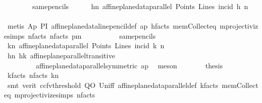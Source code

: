 \begin{isabellebody}
\ \ \ \ \ \ \ \ same{\isacharunderscore}{\kern0pt}pencils{\isacharparenright}{\kern0pt}\isanewline
\ \ \ \ \isamarkupfalse%
\ hn{}{\isacharcolon}{\kern0pt}\ {\isachardoublequoteopen}affine{\isacharunderscore}{\kern0pt}plane{\isacharunderscore}{\kern0pt}data{\isachardot}{\kern0pt}parallel\ Points\ Lines\ {\isacharparenleft}{\kern0pt}incid{\isacharparenright}{\kern0pt}\ h\ n{}{\isachardoublequoteclose}\isanewline
\ \ \ \ \ \ \isamarkupfalse%
\ {\isacharparenleft}{\kern0pt}metis\ Ap{}{}\ PI\ affine{\isacharunderscore}{\kern0pt}plane{\isacharunderscore}{\kern0pt}data{\isachardot}{\kern0pt}line{\isacharunderscore}{\kern0pt}pencil{\isacharunderscore}{\kern0pt}def\ ap\ h{\isacharunderscore}{\kern0pt}facts\ mem{\isacharunderscore}{\kern0pt}Collect{\isacharunderscore}{\kern0pt}eq\ mprojectivize{\isachardot}{\kern0pt}simps{\isacharparenleft}{\kern0pt}{}{\isacharparenright}{\kern0pt}\ n{}{\isacharunderscore}{\kern0pt}facts\ n{\isacharunderscore}{\kern0pt}facts\ pm\isanewline
\ \ \ \ \ \ \ \ \ \ same{\isacharunderscore}{\kern0pt}pencils{\isacharparenright}{\kern0pt}\isanewline
\ \ \ \ \isamarkupfalse%
\ k{}n{}{\isacharcolon}{\kern0pt}\ {\isachardoublequoteopen}affine{\isacharunderscore}{\kern0pt}plane{\isacharunderscore}{\kern0pt}data{\isachardot}{\kern0pt}parallel\ Points\ Lines\ {\isacharparenleft}{\kern0pt}incid{\isacharparenright}{\kern0pt}\ k{}\ n{}{\isachardoublequoteclose}\ \isamarkupfalse%
\ hn{}\ hk{}\ affine{\isacharunderscore}{\kern0pt}plane{\isachardot}{\kern0pt}parallel{\isacharunderscore}{\kern0pt}transitive\ \isanewline
\ \ \ \ \ \ \ \ \ affine{\isacharunderscore}{\kern0pt}plane{\isacharunderscore}{\kern0pt}data{\isachardot}{\kern0pt}parallel{\isacharunderscore}{\kern0pt}symmetric\ ap\ \isamarkupfalse%
\ meson\isanewline
\ \ \ \ \isamarkupfalse%
\ \isamarkupfalse%
\ {\isacharquery}{\kern0pt}thesis\ \isamarkupfalse%
\ k{\isacharunderscore}{\kern0pt}facts\ n{\isacharunderscore}{\kern0pt}facts\ k{}n{}\isanewline
\ \ \ \ \ \ \isamarkupfalse%
\ {\isacharparenleft}{\kern0pt}smt\ {\isacharparenleft}{\kern0pt}verit{\isacharcomma}{\kern0pt}\ ccfv{\isacharunderscore}{\kern0pt}threshold{\isacharparenright}{\kern0pt}\ QO\ Un{\isacharunderscore}{\kern0pt}iff\ affine{\isacharunderscore}{\kern0pt}plane{\isacharunderscore}{\kern0pt}data{\isachardot}{\kern0pt}parallel{\isacharunderscore}{\kern0pt}def\ k{}{\isacharunderscore}{\kern0pt}facts\ mem{\isacharunderscore}{\kern0pt}Collect{\isacharunderscore}{\kern0pt}eq\ mprojectivize{\isachardot}{\kern0pt}simps{\isacharparenleft}{\kern0pt}{}{\isacharcomma}{\kern0pt}{}{\isacharcomma}{\kern0pt}{}{\isacharparenright}{\kern0pt}\ n{}{\isacharunderscore}{\kern0pt}facts\isanewline

\end{isabellebody}

